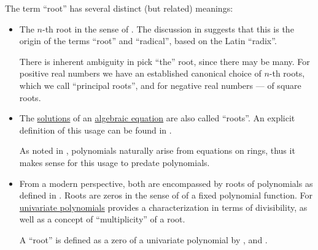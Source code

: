 \begin{remark}\label{rem:root_terminology}
  The term \enquote{root} has several distinct (but related) meanings:
  \begin{itemize}
    \item The \( n \)-th root in the sense of . The discussion in \cite{HSMSE:radical_symbol_history} suggests that this is the origin of the terms \enquote{root} and \enquote{radical}, based on the Latin \enquote{radix}.

    There is inherent ambiguity in pick \enquote{the} root, since there may be many. For positive real numbers we have an established canonical choice of \( n \)-th roots, which we call \enquote{principal roots}, and for negative real numbers --- of square roots.

    \item The \hyperref[def:equation/solution]{solutions} of an \hyperref[def:algebraic_equation]{algebraic equation} are also called \enquote{roots}. An explicit definition of this usage can be found in .

    As noted in , polynomials naturally arise from equations on rings, thus it makes sense for this usage to predate polynomials.

    \item From a modern perspective, both are encompassed by roots of polynomials as defined in . Roots are zeros in the sense of  of a fixed polynomial function. For \hyperref[def:univariate_polynomial]{univariate polynomials}  provides a characterization in terms of divisibility, as well as a concept of \enquote{multiplicity} of a root.

    A \enquote{root} is defined as a zero of a univariate polynomial by
    ,
     and
    .
  \end{itemize}
\end{remark}

